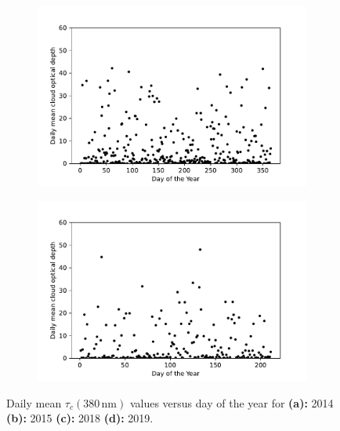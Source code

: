 \documentclass{optica-article}
\begin{document}
\begin{figure}
	\begin{subfigure}[b]{0.45\textwidth}
		\includegraphics[width=\textwidth]{COD_vs_DOY_2018}
		\caption{}
		\label{fig:codvsdoy2018}
	\end{subfigure}
	\hfill
	\begin{subfigure}[b]{0.45\textwidth}
		\includegraphics[width=\textwidth]{COD_vs_DOY_2019}
		\caption{}
		\label{fig:codvsdoy2019}
	\end{subfigure}
	
	\caption{Daily mean $\tau_c{\scriptstyle(380 \, \text{nm})}$ values versus day of the year for \textbf{(a):} 2014 \textbf{(b):} 2015 \textbf{(c):} 2018 \textbf{(d):} 2019.}
\end{figure}
\end{document}
